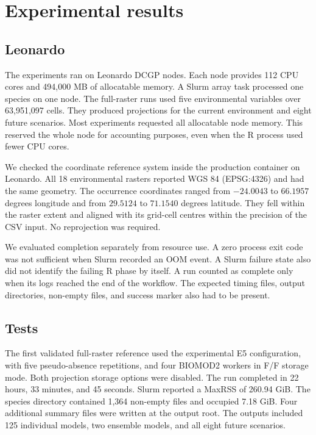 \chapter{Experimental results}



\section{Leonardo}

The experiments ran on Leonardo DCGP nodes. Each node provides 112 CPU cores and 494,000 MB of allocatable memory. A Slurm array task processed one species on one node. The full-raster runs used five environmental variables over 63,951,097 cells. They produced projections for the current environment and eight future scenarios. Most experiments requested all allocatable node memory. This reserved the whole node for accounting purposes, even when the R process used fewer CPU cores.

We checked the coordinate reference system inside the production container on Leonardo. All 18 environmental rasters reported WGS 84 (EPSG:4326) and had the same geometry. The occurrence coordinates ranged from $-24.0043$ to $66.1957$ degrees longitude and from $29.5124$ to $71.1540$ degrees latitude. They fell within the raster extent and aligned with its grid-cell centres within the precision of the CSV input. No reprojection was required.

We evaluated completion separately from resource use. A zero process exit code was not sufficient when Slurm recorded an OOM event. A Slurm failure state also did not identify the failing R phase by itself. A run counted as complete only when its logs reached the end of the workflow. The expected timing files, output directories, non-empty files, and success marker also had to be present.

\section{Tests}

The first validated full-raster reference used the experimental E5 configuration, with five pseudo-absence repetitions, and four BIOMOD2 workers in F/F storage mode. Both projection storage options were disabled. The run completed in 22 hours, 33 minutes, and 45 seconds. Slurm reported a MaxRSS of 260.94 GiB. The species directory contained 1,364 non-empty files and occupied 7.18 GiB. Four additional summary files were written at the output root. The outputs included 125 individual models, two ensemble models, and all eight future scenarios.

